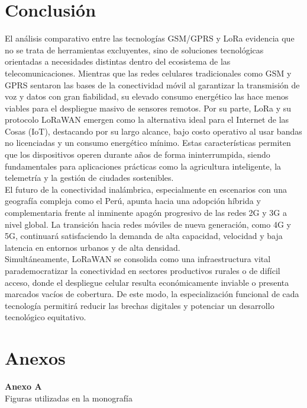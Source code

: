 \documentclass[12pt,a4paper]{article}
\begin{document}
	\pagebreak
	\section{Conclusión}

	El análisis comparativo entre las tecnologías GSM/GPRS y LoRa evidencia que no se trata de herramientas excluyentes, sino de soluciones tecnológicas orientadas a necesidades distintas dentro del ecosistema de las telecomunicaciones. Mientras que las redes celulares tradicionales como GSM y GPRS sentaron las bases de la conectividad móvil al garantizar la transmisión de voz y datos con gran fiabilidad, su elevado consumo energético las hace menos viables para el despliegue masivo de sensores remotos. Por su parte, LoRa y su protocolo LoRaWAN emergen como la alternativa ideal para el Internet de las Cosas (IoT), destacando por su largo alcance, bajo costo operativo al usar bandas no licenciadas y un consumo energético mínimo. Estas características permiten que los dispositivos operen durante años de forma ininterrumpida, siendo fundamentales para aplicaciones prácticas como la agricultura inteligente, la telemetría y la gestión de ciudades sostenibles.\\

	El futuro de la conectividad inalámbrica, especialmente en escenarios con una geografía compleja como el Perú, apunta hacia una adopción híbrida y complementaria frente al inminente apagón progresivo de las redes 2G y 3G a nivel global. La transición hacia redes móviles de nueva generación, como 4G y 5G, continuará satisfaciendo la demanda de alta capacidad, velocidad y baja latencia en entornos urbanos y de alta densidad.\\
	
	Simultáneamente, LoRaWAN se consolida como una infraestructura vital parademocratizar la conectividad en sectores productivos rurales o de difícil acceso, donde el despliegue celular resulta económicamente inviable o presenta marcados vacíos de cobertura. De este modo, la especialización funcional de cada tecnología permitirá reducir las brechas digitales y potenciar un desarrollo tecnológico equitativo.
	
	\pagebreak
	\section{Anexos}
		
		\setcounter{figure}{0}
	\setcounter{table}{0}
	
	\begin{center}
		\textbf{Anexo A}\\[0.3cm]
		Figuras utilizadas en la monografía
	\end{center}
	\vspace{0.5cm}
	
\end{document}
